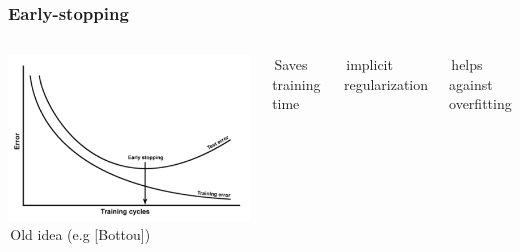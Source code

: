\documentclass{beamer}
\def\mydot{\structure{\rule{1ex}{1ex}}\,}
\newcommand{\mycite}[1]{\textcolor{myblue}{[#1]}}
\begin{document}
\begin{frame}\frametitle{Early-stopping}
  \begin{columns}
    \includegraphics[width=1\linewidth]{early-stopping-graphic}
    \mydot Old idea (e.g \mycite{Bottou})

    \bigskip
    
    \mydot Saves training time
    \bigskip
    
    \mydot implicit regularization

    \bigskip

    \mydot helps against overfitting
  \end{columns}
\end{frame}
\end{document}
